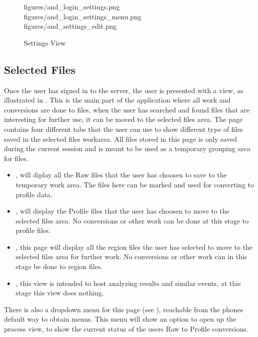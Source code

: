 \begin{figure}[h]
\addThreeImages
{figures/and_login_settings.png}
{figures/and_login_settings_menu.png}
{figures/and_settings_edit.png}
\caption{Settings View}
\label{fig:and_settings_man}
\end{figure}
\FloatBarrier

\subsection{Selected Files}\label{sec:and_manual_selected}
Once the user has signed in to the server, the user is presented with a  view, as illustrated in .
This is the main part of the application where all work and conversions are done to files, when the user has searched and found files that are interesting for further use, it can be moved to the selected files area. 
The page contains four different tabs that the user can use to show different type of files saved in the selected files workarea. All files stored in this page is only saved during the current session and is meant to be used as a temporary grouping area for files. 

\begin{itemize}

	\item {}, will diplay all the Raw files that the user has choosen to save to the temporary work area. The files here can be marked and used for converting to profile data.
    \item {}, will display the Profile files that the user has choosen to move to the selected files area. No conversions or other work can be done at this stage to profile files.
    \item {}, this page will display all the region files the user has selected to move to the selected files area for further work. No conversions or other work can in this stage be done to region files.
    \item {}, this view is intended to host analyzing results and similar events, at this stage this view does nothing.
    
\end{itemize}

There is also a dropdown menu for this page (see ), reachable from the phones default way to obtain menus. This menu will show an option to open up the process view, to show the current status of the users Raw to Profile conversions.


